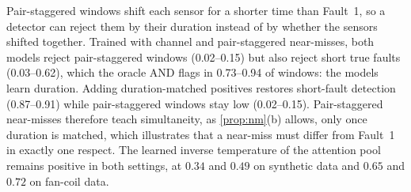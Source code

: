 \documentclass[11pt]{article}
\numberwithin{equation}{section}
\theoremstyle{plain}
\begin{document}
Pair-staggered windows shift each sensor for a shorter time than Fault~1, so a detector can reject them by their duration instead of by whether the sensors shifted together. Trained with channel and pair-staggered near-misses, both models reject pair-staggered windows (0.02--0.15) but also reject short true faults (0.03--0.62), which the oracle AND flags in 0.73--0.94 of windows: the models learn duration. Adding duration-matched positives restores short-fault detection (0.87--0.91) while pair-staggered windows stay low (0.02--0.15). Pair-staggered near-misses therefore teach simultaneity, as \cref{prop:nm}(b) allows, only once duration is matched, which illustrates that a near-miss must differ from Fault~1 in exactly one respect. The learned inverse temperature of the attention pool remains positive in both settings, at $0.34$ and $0.49$ on synthetic data and $0.65$ and $0.72$ on fan-coil data.



\end{document}
